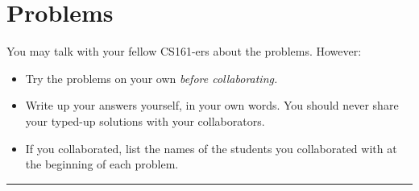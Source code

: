\documentclass{article}
\begin{document}
\section*{Problems}
You may talk with your fellow CS161-ers about the problems.  However:
\begin{itemize}
	\item Try the problems on your own \em before \em collaborating.
	\item Write up your answers yourself, in your own words.   You should never share your typed-up solutions with your collaborators.
	\item If you collaborated, list the names of the students you collaborated with at the beginning of each problem.
\end{itemize}

\noindent
\rule{\linewidth}{0.4pt}
\end{document}
